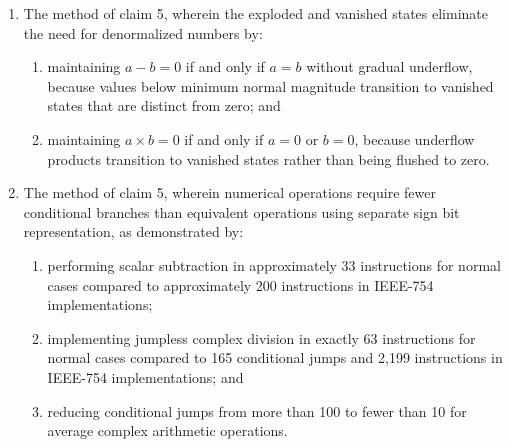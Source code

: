 \documentclass[12pt,letter]{article}
\begin{document}
\begin{enumerate}
    \item The method of claim 5, wherein the exploded and vanished states eliminate the need for denormalized numbers by:
        \begin{enumerate}
            \item maintaining $a - b = 0$ if and only if $a = b$ without gradual underflow, because values below minimum normal magnitude transition to vanished states that are distinct from zero; and
            \item maintaining $a \times b = 0$ if and only if $a = 0$ or $b = 0$, because underflow products transition to vanished states rather than being flushed to zero.
        \end{enumerate}

\newpage
    \item The method of claim 5, wherein numerical operations require fewer conditional branches than equivalent operations using separate sign bit representation, as demonstrated by:
        \begin{enumerate}
            \item performing scalar subtraction in approximately 33 instructions for normal cases compared to approximately 200 instructions in IEEE-754 implementations;
            \item implementing jumpless complex division in exactly 63 instructions for normal cases compared to 165 conditional jumps and 2,199 instructions in IEEE-754 implementations; and
            \item reducing conditional jumps from more than 100 to fewer than 10 for average complex arithmetic operations.
        \end{enumerate}
    

\end{enumerate}
\end{document}
